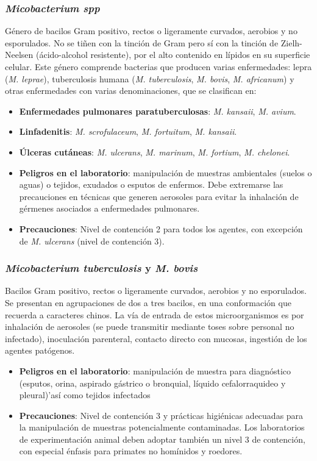 \subsubsection{\textit{Micobacterium spp}}
Género de bacilos Gram positivo, rectos o ligeramente curvados, aerobios y no esporulados. No se tiñen con la tinción de Gram pero sí con la tinción de Zielh-Neelsen (ácido-alcohol resistente), por el alto contenido en lípidos en su superficie celular. Este género comprende bacterias que producen varias  enfermedades: lepra (\textit{M. leprae}), tuberculosis humana (\textit{M. tuberculosis}, \textit{M. bovis}, \textit{M. africanum}) y otras enfermedades con varias denominaciones, que se clasifican en:
\begin{itemize}[itemsep=0pt,parsep=0pt,topsep=0pt,partopsep=0pt]
    \item \textbf{Enfermedades pulmonares paratuberculosas}: \textit{M. kansaii}, \textit{ M. avium}.
    \item \textbf{Linfadenitis}: \textit{M. scrofulaceum}, \textit{M. fortuitum}, \textit{M. kansaii}.
    \item \textbf{Úlceras cutáneas}: \textit{M. ulcerans}, \textit{M. marinum}, \textit{M. fortium}, \textit{M. chelonei}.
\end{itemize}
\begin{itemize}[itemsep=0pt,parsep=0pt,topsep=0pt,partopsep=0pt]
    \item \textbf{Peligros en el laboratorio}: manipulación de muestras ambientales (suelos o aguas) o tejidos, exudados o esputos de enfermos. Debe extremarse las precauciones en técnicas que generen aerosoles para evitar la inhalación de gérmenes asociados a enfermedades pulmonares.
    \item \textbf{Precauciones}: Nivel de contención 2 para todos los agentes, con excepción de \textit{M. ulcerans} (nivel de contención 3).
\end{itemize}
\subsubsection{\textit{Micobacterium tuberculosis}  y \textit{M. bovis}}
Bacilos Gram positivo, rectos o ligeramente curvados, aerobios y no esporulados. Se presentan en agrupaciones de dos a tres bacilos, en una conformación que recuerda a caracteres chinos. La vía de entrada de estos microorganismos es por inhalación de aerosoles (se puede transmitir mediante toses sobre personal no infectado), inoculación parenteral, contacto directo con mucosas, ingestión de los agentes patógenos.
\begin{itemize}[itemsep=0pt,parsep=0pt,topsep=0pt,partopsep=0pt]
    \item \textbf{Peligros en el laboratorio}: manipulación de muestra para diagnóstico (esputos, orina, aspirado gástrico o bronquial, líquido cefalorraquideo y pleural)'así como tejidos infectados
    \item \textbf{Precauciones}: Nivel de contención 3 y prácticas higiénicas adecuadas para la manipulación de muestras potencialmente contaminadas. Los laboratorios de experimentación animal deben adoptar también un nivel 3 de contención, con especial énfasis para primates no homínidos y roedores.
\end{itemize}
